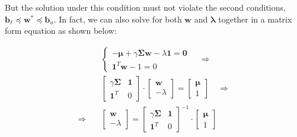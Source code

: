 \documentclass{beamer}
\begin{document}
\begin{frame}

\justifying
But the solution under this condition must not violate the second conditions, $\mathbf{b}_{\ell} \preccurlyeq \mathbf{w}^{*} \preccurlyeq \mathbf{b}_{u}$. In fact, we can also solve for both $\mathbf{w}$ and $\boldsymbol\lambda$ together in a matrix form equation as shown below:

\justifying
\begin{equation*}
\begin{aligned}
	& \begin{cases}
	-\boldsymbol\mu + \gamma\mathbf{\Sigma}\mathbf{w} - \lambda \mathbf{1} = \mathbf{0}  \\
	\mathbf{1}^{T}\mathbf{w} - 1 = 0
	\end{cases}
	\quad \Rightarrow \\
	& \begin{bmatrix}
		\gamma\mathbf{\Sigma} & \mathbf{1} \\
		\mathbf{1}^{T} & 0
	   \end{bmatrix}
	   \cdot
	   \begin{bmatrix}
	   	\mathbf{w} \\
		-\lambda
	  \end{bmatrix}
	  =
	  \begin{bmatrix}
	  	\boldsymbol\mu \\ 
		1
	\end{bmatrix}
	\quad \Rightarrow \\
	\Rightarrow \quad &
	\begin{bmatrix}
	   	\mathbf{w} \\
		-\lambda
	  \end{bmatrix}
	  =
	  \begin{bmatrix}
		\gamma\mathbf{\Sigma} & \mathbf{1} \\
		\mathbf{1}^{T} & 0
	   \end{bmatrix}^{-1}
	  \cdot
	  \begin{bmatrix}
	  	\boldsymbol\mu \\ 
		1
	\end{bmatrix}
\end{aligned}
\end{equation*}


\end{frame}
\end{document}
